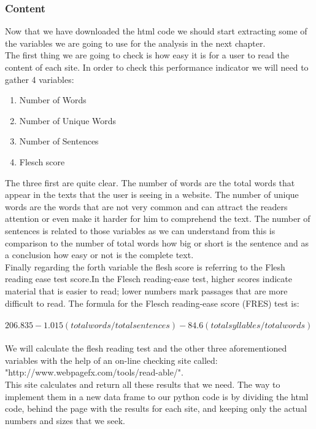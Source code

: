 \documentclass{article}
\begin{document}
\subsubsection{Content}
Now that we have downloaded the html code we should start extracting some of the variables we are going to use for the analysis in the next chapter.\\
The first thing we are going to check is how easy it is for a user to read the content of each site. In order to check this performance indicator we will need to gather 4 variables:
\begin{enumerate}
\item Number of Words
\item Number of Unique Words
\item Number of Sentences
\item Flesch score
\end{enumerate}
The three first are quite clear. The number of words are the total words that appear in the texts that the user is seeing in a website. The number of unique words are the words that are not very common and can attract the readers attention or even make it harder for him to comprehend the text. The number of sentences is related to those variables as we can understand from this is comparison to the number of total words how big or short is the sentence and as a conclusion how easy or not is the complete text.\\
Finally regarding the forth variable the flesh score is referring to the Flesh reading ease test score.In the Flesch reading-ease test, higher scores indicate material that is easier to read; lower numbers mark passages that are more difficult to read. The formula for the Flesch reading-ease score (FRES) test is:\\ \\
$206.835 - 1.015 (total words/total sentences) - 84.6 (total syllables/total words)$\\
\\
We will calculate the flesh reading test and the other three aforementioned variables with the help of an on-line checking site called: \\
"http://www.webpagefx.com/tools/read-able/".\\
This site calculates and return all these results that we need. The way to implement them in a new data frame to our python code is by dividing the html code, behind the page with the results for each site, and keeping only the actual numbers and sizes that we seek. \\
\end{document}
